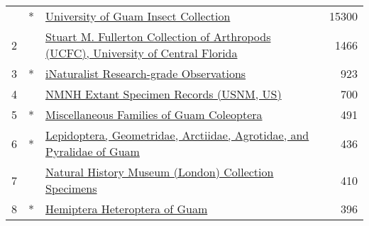 \begin{longtable}{llp{5in}r}
\bottomrule
\endlastfoot
1  &  * &                                                                                                                                                             \href{https://www.gbif.org/dataset/56e311e3-43c6-4b99-aa21-af396074d5e3}{University of Guam Insect Collection} &         15300 \\
2  &    &                                                                                                               \href{https://www.gbif.org/dataset/262f8270-f9c2-4bc6-a562-8ed71c0790e6}{Stuart M. Fullerton Collection of Arthropods (UCFC), University of Central Florida} &          1466 \\
3  &  * &                                                                                                                                                          \href{https://www.gbif.org/dataset/50c9509d-22c7-4a22-a47d-8c48425ef4a7}{iNaturalist Research-grade Observations} &           923 \\
4  &    &                                                                                                                                                          \href{https://www.gbif.org/dataset/821cc27a-e3bb-4bc5-ac34-89ada245069d}{NMNH Extant Specimen Records (USNM, US)} &           700 \\
5  &  * &                                                                                                                                                        \href{https://www.gbif.org/dataset/5f279ac2-63c6-4bd8-be9e-0e3d82b73ab2}{Miscellaneous Families of Guam Coleoptera} &           491 \\
6  &  * &                                                                                                                            \href{https://www.gbif.org/dataset/058b438a-ffe3-452b-a286-9267419b3014}{Lepidoptera, Geometridae, Arctiidae, Agrotidae, and Pyralidae of Guam} &           436 \\
7  &    &                                                                                                                                             \href{https://www.gbif.org/dataset/7e380070-f762-11e1-a439-00145eb45e9a}{Natural History Museum (London) Collection Specimens} &           410 \\
8  &  * &                                                                                                                                                                    \href{https://www.gbif.org/dataset/e7ce9dca-1d2b-4aad-8471-7ea2c177da53}{Hemiptera Heteroptera of Guam} &           396 \\

\end{longtable}
